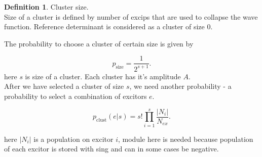 \documentclass[twoside,english]{uiofysmaster}
\theoremstyle{definition}
\newtheorem{defn}{Definition}
\begin{document}
\begin{defn}Cluster size.\\
 Size of a cluster is defined by number of excips that are used to collapse the wave function. Reference determinant is considered as a cluster of size $0$.
\end{defn}
The probability to choose a cluster of certain size is given by

\begin{equation}
	p_{\text{size}} = \frac{1}{2^{s+1}}.
\end{equation}
here $s$ is size of a cluster. 
Each cluster has it's amplitude $A$.\\
After we have selected a cluster of size $s$, we need another probability - a probability to select a combination of excitors $e$.

\begin{equation}
p_{\text{clust}} (e|s)= s! \prod_{i=1}^s \frac{|N_i|}{N_{ex}}.
\end{equation}

here $|N_i|$ is a population on excitor $i$, module here is needed because population of each excitor is stored with sing and can in some cases be negative.\\
\end{document}
